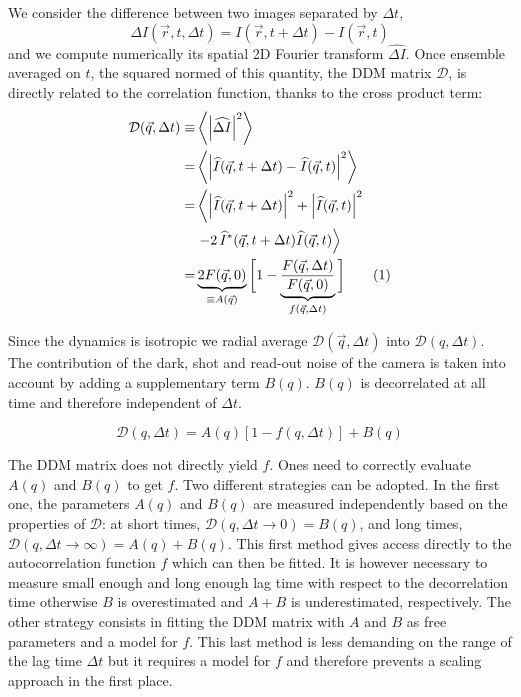\documentclass[prb,reprint,amsmath,amssymb]{revtex4-1}
\newcommand{\tg}[1]{{\color{magenta}#1}} %
\begin{document}
 We consider the difference between two images separated by $\Delta t$,
\begin{equation}
\Delta I(\vec{r},t, \Delta t) = I(\vec{r}, t+\Delta t) - I(\vec{r}, t)
\label{eq:DI}
\end{equation}
%
and we compute numerically its spatial 2D Fourier transform $\widehat{\Delta I}$. Once ensemble averaged on $t$, the squared normed of this quantity, the DDM matrix $\mathcal{D}$, is directly related to the correlation function, thanks to the cross product term:
\begin{align*}
\mathcal{D}(\vec{q},\Delta t) \equiv& \left\langle \left|\widehat{\Delta I}\right|^2 \right\rangle\\
 =& \left\langle \left|\widehat{I}(\vec{q},t+\Delta t) - \widehat{I}(\vec{q},t)\right|^2 \right\rangle \\
=& \left\langle \left|\widehat{I}(\vec{q},t+ \Delta t)\right|^2 + \left|\widehat{I}(\vec{q},t)\right|^2\right. \\
&\left.- 2 \, \widehat{I}^*(\vec{q},t+\Delta t) \widehat{I}(\vec{q},t) \right\rangle\\
=& \underbrace{2F(\vec{q}, 0)}_{\equiv A(\vec{q})} \bigg[ 1-\underbrace{\frac{F(\vec{q}, \Delta t)}{F(\vec{q}, 0)}}_{f(\vec{q}, \Delta t)} \bigg] \addtocounter{equation}{1}\tag{\theequation} \label{eq:DDM}
\end{align*}


\tg{Since the dynamics is isotropic we radial average $\mathcal{D}(\vec{q},\Delta t)$ into $\mathcal{D}(q,\Delta t)$.} The contribution of the \tg{dark, shot and read-out noise\cite{Mignard2015,Joubert2011}} of the camera is taken into account by adding a supplementary term $B(q)$. $B(q)$ is decorrelated  at all time and therefore independent of $\Delta t$.

\begin{equation}
\mathcal{D}(q,\Delta t) = A(q)\left[1-f(q, \Delta t)\right] + B(q)
\label{eq:D2f}
\end{equation}

\tg{The DDM matrix does not directly yield $f$. Ones need to correctly evaluate $A(q)$ and $B(q)$ to get $f$. Two different strategies can be adopted. In the first one, the parameters $A(q)$ and $B(q)$ are measured independently based on the properties of $\mathcal{D}$: at short times, $\mathcal{D}(q,\Delta t\rightarrow 0) = B(q)$, and long times, $\mathcal{D}(q,\Delta t\rightarrow \infty) = A(q)+B(q)$. This first method gives access directly to the autocorrelation function $f$ which can then be fitted. It is however necessary to measure small enough and  long enough lag time with respect to the decorrelation time otherwise $B$ is overestimated and $A+B$ is underestimated, respectively. The other strategy consists in fitting the DDM matrix with $A$ and $B$ as free parameters and a model for $f$. This last method is less demanding on the range of the lag time $\Delta t$ but it requires a model for $f$ and therefore prevents a scaling approach in the first place.}
\end{document}
